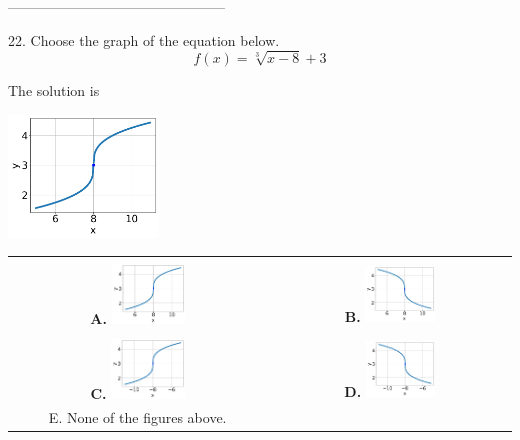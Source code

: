 \documentclass{extbook}[14pt]
\begin{document}
-----------------------------------------------

22. Choose the graph of the equation below.
\[ f(x) = \sqrt[3]{x - 8} + 3 \] 

 
 The solution is  
 \begin{center} \includegraphics[width=0.3\textwidth]{../Figures/radicalEquationToGraphAB.png} \end{center}\begin{tabular}{|c|c|} 
\hline 
 & \tabularnewline 
 \textbf{A.} \includegraphics[width=0.3\textwidth]{../Figures/radicalEquationToGraphAB.png} & \textbf{B.} \includegraphics[width=0.3\textwidth]{../Figures/radicalEquationToGraphCB.png} \tabularnewline 
\hline 
 & \tabularnewline 
 \textbf{C.} \includegraphics[width=0.3\textwidth]{../Figures/radicalEquationToGraphBB.png} & \textbf{D.} \includegraphics[width=0.3\textwidth]{../Figures/radicalEquationToGraphDB.png} \tabularnewline 
\hline 
 E. None of the figures above. & \tabularnewline 
\hline 
 \end{tabular} 
 
\end{document}
